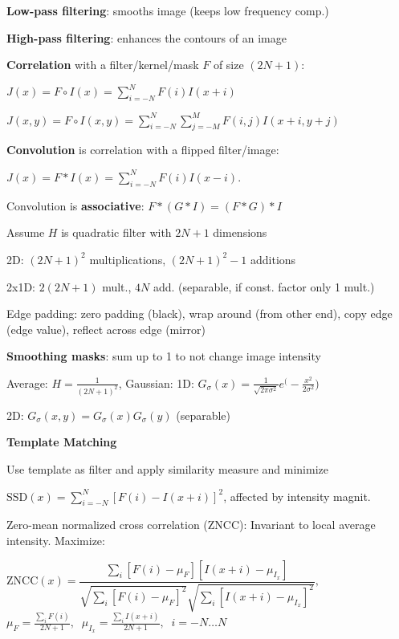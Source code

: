 \documentclass[fontsize=6pt]{scrartcl}
\renewcommand{\exp}[1]{e^{#1}}
\begin{document}
\begin{multicols*}{4}
\textbf{Low-pass filtering}: smooths image (keeps low frequency comp.)

\textbf{High-pass filtering}: enhances  the contours of an image 

\textbf{Correlation} with a filter/kernel/mask $F$ of size $(2N+1)$:

{\centering
	$J(x) = F \circ I(x) = \sum_{i=-N}^N F(i) I(x + i)$
\par}

{\centering
	$J(x,y) = F \circ I(x,y) = \sum_{i=-N}^N\sum_{j=-M}^M F(i,j) I(x + i, y+ j)$
\par}


\textbf{Convolution} is correlation with a flipped filter/image:

{\centering
	$J(x) = F \ast I(x) = \sum_{i=-N}^N F(i) I(x - i)$.
\par}

Convolution is \textbf{associative}: $F\ast (G \ast I) = (F \ast G ) \ast I$


Assume $H$ is quadratic filter with $2N+1$ dimensions

2D:	$(2N+1)^2$ multiplications, $(2N+1)^2-1$ additions

2x1D: 	$2(2N+1)$ mult., $4N$ add. (separable, if const. factor only 1 mult.)

Edge padding: zero padding (black), wrap around (from other end), copy edge (edge value), reflect across edge (mirror)

\textbf{Smoothing masks}: sum up to 1 to not change image intensity

Average: $H = \frac{1}{(2N + 1)^2}$, 
Gaussian: 1D: $G_\sigma(x) = \frac{1}{\sqrt{2\pi\sigma^2}}\exp(-\frac{x^2}{2\sigma^2})$

2D: $G_\sigma(x,y) = G_\sigma(x)G_\sigma(y)$ (separable)

\textbf{Template Matching}

Use template as filter and apply similarity measure and minimize

$\mathrm{SSD}(x) = \sum_{i=-N}^N \left[ F(i) - I(x+i) \right]^2$, affected by intensity magnit.

Zero-mean normalized cross correlation (ZNCC): Invariant to local average intensity. Maximize:

{\centering
	$
	\mathrm{ZNCC}(x) = \dfrac{\sum_i
		\left[F(i)- \mu_F\right] \left[I(x + i) - \mu_{I_x} \right]}
	{
		\sqrt{\sum_i \left[F(i) - \mu_F\right]^2}
		\sqrt{\sum_i \left[I(x+i) - \mu_{I_x}\right]^2}
	},
	$\\[3pt]
	$
	\mu_F = \frac{\sum_i F(i)}{2N + 1},\;\;
	\mu_{I_x} = \frac{\sum_i I(x+i)}{2N + 1},\;\;
	i=-N\ldots N
	$
\par}


\end{multicols*}
\end{document}
